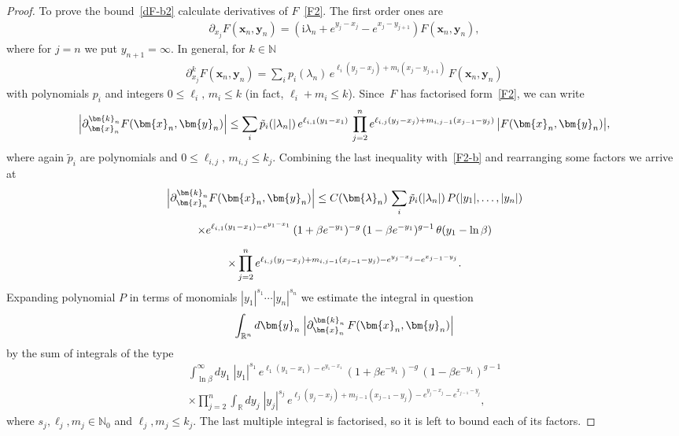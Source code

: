 \documentclass[11pt]{article}
\numberwithin{equation}{section}
\theoremstyle{plain}
\theoremstyle{definition}
\renewcommand{\imath}{\mathrm{i}}
\begin{document}
\begin{proof}
	To prove the bound~\eqref{dF-b2} calculate derivatives of $F$~\eqref{F2}. The first order ones are
	\begin{align}
		\partial_{x_j} F(\bm{x}_n, \bm{y}_{n}) = (\imath \lambda_n + e^{y_{j} - x_j} - e^{x_j - y_{j + 1}} ) F(\bm{x}_n, \bm{y}_{n}),
	\end{align}
	where for $j = n$ we put $y_{n + 1} = \infty$. In general, for $k\in \mathbb{N}$
	\begin{align}
		\partial_{x_j}^{k} F(\bm{x}_n, \bm{y}_{n }) = \sum_{i} p_i(\lambda_n) \, e^{\ell_i (y_{j} - x_j) + m_i (x_j - y_{j + 1})} \, F(\bm{x}_n, \bm{y}_{n})
	\end{align}
	with polynomials $p_i$ and integers $0 \leq \ell_i, \, m_i \leq k$ (in fact, $\ell_i + m_i \leq k$). Since~$F$ has factorised form~\eqref{F2}, we can write
	\begin{align} \label{dF-b}
		\Bigl| \partial_{\bm{x}_n}^{\bm{k}_n} F(\bm{x}_n, \bm{y}_{n}) \Bigr| \leq \sum_{i} \tilde{p}_i(|\lambda_n|) \, e^{\ell_{i,1} (y_1 - x_1)} \, \prod_{j = 2}^{n} e^{\ell_{i,j} (y_{j} - x_j) + m_{i,j-1} (x_{j - 1} - y_{j}) } \, \bigl|  F(\bm{x}_n, \bm{y}_{n}) \bigr|,
	\end{align}
	where again $\tilde{p}_i$ are polynomials and $0 \leq \ell_{i,j}, \, m_{i,j} \leq k_j$. Combining the last inequality with~\eqref{F2-b} and rearranging some factors we arrive at
	\begin{multline} \label{dF2-b}
		\Bigl| \partial_{\bm{x}_n}^{\bm{k}_n} F(\bm{x}_n, \bm{y}_{n}) \Bigr| \leq C(\bm{\lambda}_{n}) \, \sum_{i} \tilde{p}_i(|\lambda_n|) \, P(|y_1|, \dots, |y_n|) \\[2pt]
		\times e^{\ell_{i,1} (y_1 - x_1) - e^{y_1 - x_1}} \, (1 + \beta e^{-y_1})^{- g} \, (1 - \beta e^{-y_1})^{g - 1} \, \theta(y_1 - \ln \beta) \\[6pt]
		\times \prod_{j = 2}^{n} e^{\ell_{i,j} (y_{j} - x_j) + m_{i,j-1} (x_{j - 1} - y_{j}) - e^{y_j - x_j} - e^{x_{j - 1} - y_{j}} }.
	\end{multline}
	Expanding polynomial $P$ in terms of monomials $|y_1|^{s_1} \cdots |y_n|^{s_n}$ we estimate the integral in question
	\begin{align}
		\int_{\mathbb{R}^n} d\bm{y}_n \; \Bigl| \partial_{\bm{x}_n}^{\bm{k}_n} \, F (\bm{x}_n, \bm{y}_n) \Bigr| 
	\end{align}
	by the sum of integrals of the type
	\begin{multline}\label{intF-b}
		\int_{\ln \beta}^\infty dy_1 \; |y_1|^{s_1} \, e^{\ell_{1} (y_1 - x_1) - e^{y_1 - x_1}} \, (1 + \beta e^{-y_1})^{- g} \, (1 - \beta e^{-y_1})^{g - 1} \\[3pt]
		\times \prod_{j = 2}^{n} \int_{\mathbb{R}} dy_j \; |y_j|^{s_j} \,  e^{\ell_{j} (y_{j} - x_j) + m_{j-1} (x_{j - 1} - y_{j}) - e^{y_j - x_j} - e^{x_{j - 1} - y_{j}} },
	\end{multline}
	where $s_j, \ell_j, m_j \in \mathbb{N}_0$ and $\ell_j, m_j \leq k_j$. The last multiple integral is factorised, so it is left to bound each of its factors. 
	

\end{proof}
\end{document}
